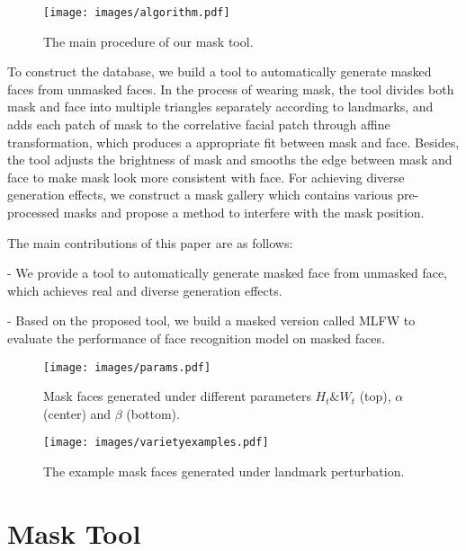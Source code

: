\documentclass[final]{cvpr}
\begin{document}
\begin{figure*}[t]
	\begin{center}
		\texttt{[image: images/algorithm.pdf]}
	\end{center}
	\caption{
		The main procedure of our mask tool.
	}
\label{algorithmimg}
\end{figure*}


To construct the database, we build a tool to automatically generate masked faces from unmasked faces.
In the process of wearing mask, the tool divides both mask and face into multiple triangles separately according to landmarks, and adds each patch of mask to the correlative facial patch through affine transformation, which produces a appropriate fit between mask and face.
Besides, the tool adjusts the brightness of mask and smooths the edge between mask and face to make mask look more consistent with face.
For achieving diverse generation effects, we construct a mask gallery which contains various pre-processed masks and propose a method to interfere with the mask position.

The main contributions of this paper are as follows:

- We provide a tool to automatically generate masked face from unmasked face, which achieves real and diverse generation effects.

- Based on the proposed tool, we build a masked version called MLFW to evaluate the performance of face recognition model on masked faces.

\begin{figure*}[t]
	\begin{center}
		\texttt{[image: images/params.pdf]}
	\end{center}
	\caption{
		Mask faces generated under different parameters $H_{t} \& W_{t}$ (top), $\alpha$ (center) and $\beta$ (bottom).
	}
	\label{params}
\end{figure*}


\begin{figure}[t]
	\begin{center}
		\texttt{[image: images/varietyexamples.pdf]}
	\end{center}
	\caption{
		The example mask faces generated under landmark perturbation.
	}
	\label{varietyexamples}
\end{figure}

\section{Mask Tool}
\end{document}
